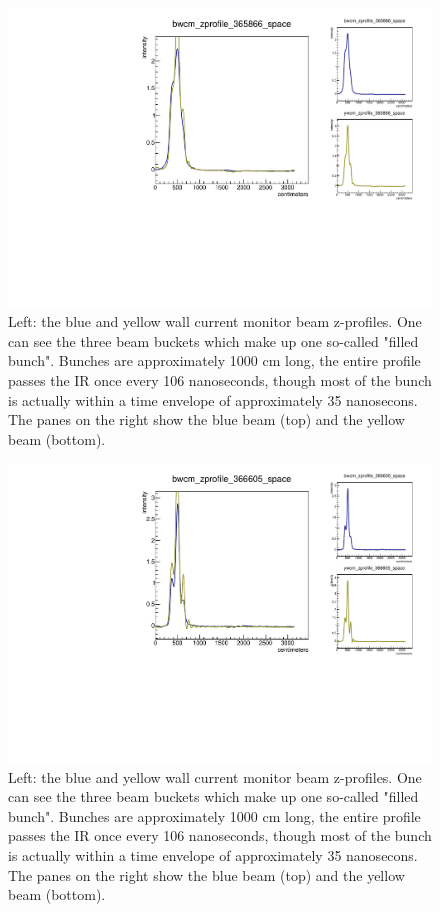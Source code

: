 \begin{figure}
\begin{center}
\includegraphics[width=\linewidth,height=\textheight,keepaspectratio]{./figures/365866_wcm_zprofile}
\caption{ 
Left: the blue and yellow wall current monitor beam z-profiles. One can see the
three beam buckets which make up one so-called "filled bunch". Bunches are
approximately 1000 cm long, the entire profile passes the IR once every 106
nanoseconds, though most of the bunch is actually within a time envelope of
approximately 35 nanosecons. The panes on the right show the blue beam (top)
and the yellow beam (bottom).
}
\label{fig:365866_wcm_zprofile}
\end{center}
\end{figure}

\begin{figure}
\begin{center}
\includegraphics[width=\linewidth,height=\textheight,keepaspectratio]{./figures/366605_wcm_zprofile}
\caption{ 
Left: the blue and yellow wall current monitor beam z-profiles. One can see the
three beam buckets which make up one so-called "filled bunch". Bunches are
approximately 1000 cm long, the entire profile passes the IR once every 106
nanoseconds, though most of the bunch is actually within a time envelope of
approximately 35 nanosecons. The panes on the right show the blue beam (top)
and the yellow beam (bottom).
}
\label{fig:366605_wcm_zprofile}
\end{center}
\end{figure}

